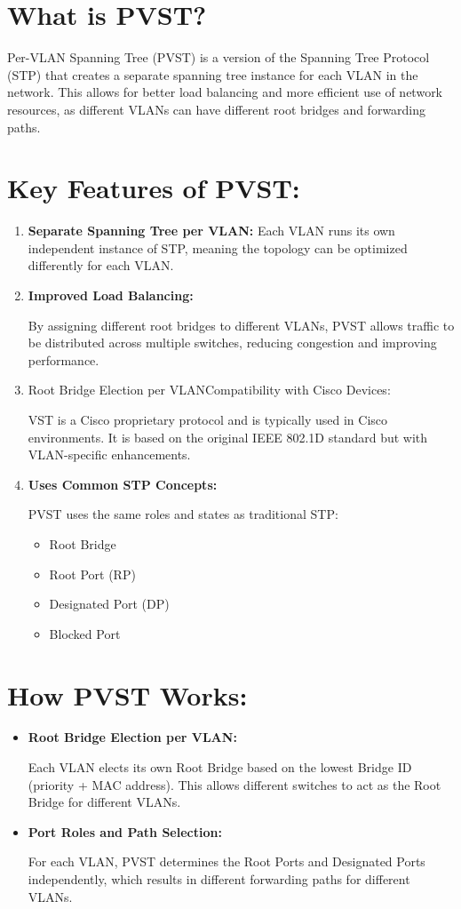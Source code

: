 \documentclass[a4paper]{book}
\begin{document}
\section*{What is PVST?}
Per-VLAN Spanning Tree (PVST) is a version of the Spanning Tree Protocol (STP) that creates a separate spanning tree instance for each VLAN in the network. This allows for better load balancing and more efficient use of network resources, as different VLANs can have different root bridges and forwarding paths.


\section*{Key Features of PVST:}
\begin{enumerate}
	\item \textbf{Separate Spanning Tree per VLAN:}
	      \newline
	      Each VLAN runs its own independent instance of STP, meaning the topology can be optimized differently for each VLAN.
	\item \textbf{Improved Load Balancing:}

	      By assigning different root bridges to different VLANs, PVST allows traffic to be distributed across multiple switches, reducing congestion and improving performance.

	\item Root Bridge Election per VLANCompatibility with Cisco Devices:

	      VST is a Cisco proprietary protocol and is typically used in Cisco environments. It is based on the original IEEE 802.1D standard but with VLAN-specific enhancements.
	\item \textbf{Uses Common STP Concepts:}

	      PVST uses the same roles and states as traditional STP:
	      \begin{itemize}
		      \item Root Bridge
		      \item Root Port (RP)
		      \item Designated Port (DP)
		      \item Blocked Port
	      \end{itemize}
\end{enumerate}

\section*{How PVST Works:}
\begin{itemize}
	\item \textbf{Root Bridge Election per VLAN:}

	      Each VLAN elects its own Root Bridge based on the lowest Bridge ID (priority + MAC address). This allows different switches to act as the Root Bridge for different VLANs.

	\item \textbf{Port Roles and Path Selection:}

	      For each VLAN, PVST determines the Root Ports and Designated Ports independently, which results in different forwarding paths for different VLANs.
\end{itemize}
\end{document}
